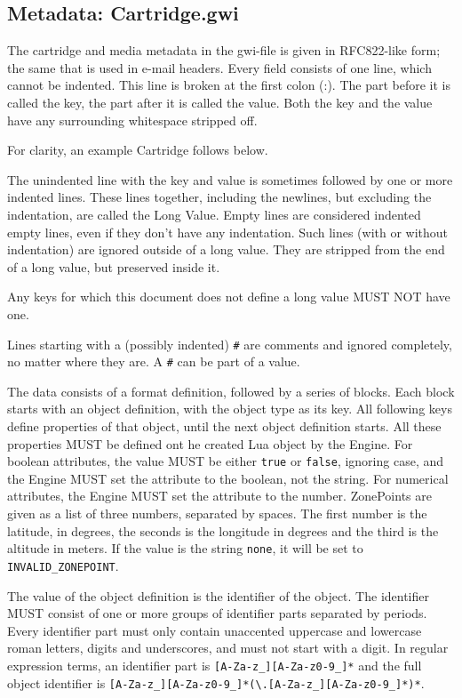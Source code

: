 \documentclass{article}
\begin{document}
\subsection{Metadata: Cartridge.gwi}
The cartridge and media metadata in the gwi-file is given in RFC822-like form;
the same that is used in e-mail headers. Every field consists of one line,
which cannot be indented.  This line is broken at the first colon (:).  The
part before it is called the key, the part after it is called the value.  Both
the key and the value have any surrounding whitespace stripped off.

For clarity, an example Cartridge follows below.

The unindented line with the key and value is sometimes followed by one or more
indented lines. These lines together, including the newlines, but excluding the
indentation, are called the Long Value. Empty lines are considered indented
empty lines, even if they don't have any indentation.  Such lines (with or
without indentation) are ignored outside of a long value.  They are stripped
from the end of a long value, but preserved inside it.

Any keys for which this document does not define a long value MUST NOT have one.

Lines starting with a (possibly indented) \texttt{\#} are comments and ignored
completely, no matter where they are.  A \texttt{\#} can be part of a value.

The data consists of a format definition, followed by a series of blocks.  Each
block starts with an object definition, with the object type as its key.  All
following keys define properties of that object, until the next object
definition starts.  All these properties MUST be defined ont he created Lua
object by the Engine.  For boolean attributes, the value MUST be either
\texttt{true} or \texttt{false}, ignoring case, and the Engine MUST set the
attribute to the boolean, not the string.  For numerical attributes, the Engine
MUST set the attribute to the number.  ZonePoints are given as a list of three
numbers, separated by spaces.  The first number is the latitude, in degrees,
the seconds is the longitude in degrees and the third is the altitude in
meters.  If the value is the string \texttt{none}, it will be set to
\verb-INVALID_ZONEPOINT-.

The value of the object definition is the identifier of the object.
The identifier MUST consist of one or more groups of identifier parts
separated by periods.  Every identifier part must only contain unaccented uppercase
and lowercase roman letters, digits and underscores, and must not start with a
digit.  In regular expression terms, an identifier part is
\verb#[A-Za-z_][A-Za-z0-9_]*# and the full object identifier is
\verb#[A-Za-z_][A-Za-z0-9_]*(\.[A-Za-z_][A-Za-z0-9_]*)*#.
\end{document}
